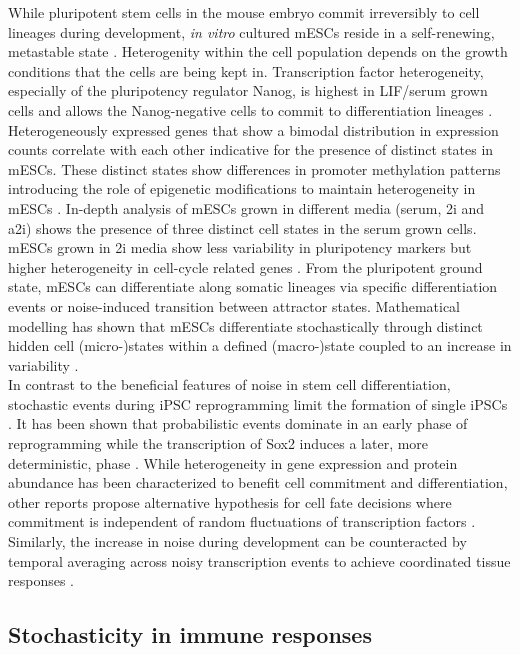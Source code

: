 While pluripotent stem cells in the mouse embryo commit irreversibly to cell lineages during development, \emph{in vitro} cultured \glspl{mESC} reside in a self-renewing, metastable state \citep{Hayashi2013}. Heterogenity within the cell population depends on the growth conditions that the cells are being kept in. Transcription factor heterogeneity, especially of the pluripotency regulator Nanog, is highest in \Gls{LIF}/serum grown cells and allows the Nanog-negative cells to commit to differentiation lineages \citep{Chickarmane2012, Torres-Padilla2014}. Heterogeneously expressed genes that show a bimodal distribution in expression counts correlate with each other indicative for the presence of distinct states in mESCs. These distinct states show differences in promoter methylation patterns introducing the role of epigenetic modifications to maintain heterogeneity in mESCs \citep{Singer2014a}. In-depth analysis of mESCs grown in different media (serum, 2i and a2i) shows the presence of three distinct cell states in the serum grown cells. mESCs grown in 2i media show less variability in pluripotency markers but higher heterogeneity in cell-cycle related genes \citep{Kolodziejczyk2015cell}. From the pluripotent ground state, mESCs can differentiate along somatic lineages via specific differentiation events or noise-induced transition between attractor states. Mathematical modelling has shown that mESCs differentiate stochastically through distinct hidden cell (micro-)states within a defined (macro-)state coupled to an increase in variability \cite{Stumpf2017}.\\

In contrast to the beneficial features of noise in stem cell differentiation, stochastic events during \gls{iPSC} reprogramming limit the formation of single iPSCs \citep{Hanna2009, Yamanaka2009}. It has been shown that probabilistic events dominate in an early phase of reprogramming while the transcription of Sox2 induces a later, more deterministic, phase \cite{Buganim2012}. While heterogeneity in gene expression and protein abundance has been characterized to benefit cell commitment and differentiation, other reports propose alternative hypothesis for cell fate decisions where commitment is independent of random fluctuations of transcription factors \cite{Hoppe2016}. Similarly, the increase in noise during development can be counteracted by temporal averaging across noisy transcription events to achieve coordinated tissue responses \citep{Stapel2017}. 

\subsection{Stochasticity in immune responses}

